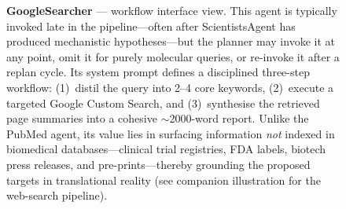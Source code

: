 \begin{figure}[htbp]
{%
}%
\caption{\textbf{GoogleSearcher} --- workflow interface view.
This agent is typically invoked late in the pipeline---often after
ScientistsAgent has produced mechanistic hypotheses---but the planner
may invoke it at any point, omit it for purely molecular queries,
or re-invoke it after a replan cycle.  Its system prompt defines a
disciplined three-step workflow: (1)~distil the query
into 2--4 core keywords, (2)~execute a targeted Google Custom Search,
and (3)~synthesise the retrieved page summaries into a cohesive
$\sim$2000-word report.  Unlike the PubMed agent, its value lies in
surfacing information \emph{not} indexed in biomedical databases---clinical
trial registries, FDA labels, biotech press releases, and
pre-prints---thereby grounding the proposed targets in translational
reality (see companion illustration for the web-search pipeline).}
\label{fig:closeup-google}
\end{figure}
